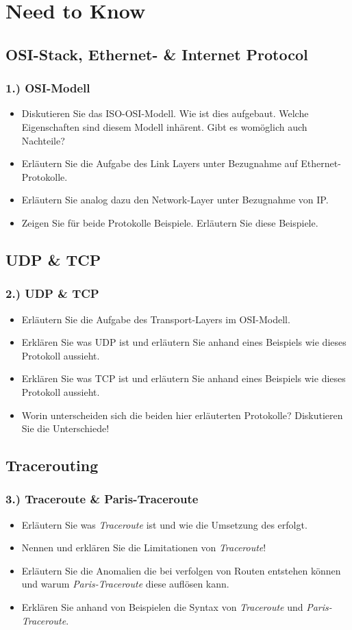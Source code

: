 \documentclass[xcolor=dvipsnames, aspectratio=169]{beamer}
\begin{document}
\section{Need to Know}
\subsection{OSI-Stack, Ethernet- \& Internet Protocol}
\begin{frame}
	\frametitle{1.) OSI-Modell}
	\begin{itemize}
		\item Diskutieren Sie das ISO-OSI-Modell. Wie ist dies aufgebaut. Welche Eigenschaften sind diesem Modell inhärent. Gibt es womöglich auch Nachteile?
		\item Erläutern Sie die Aufgabe des Link Layers unter Bezugnahme auf Ethernet-Protokolle. 
		\item Erläutern Sie analog dazu den Network-Layer unter Bezugnahme von IP.
		\item Zeigen Sie für beide Protokolle Beispiele. Erläutern Sie diese Beispiele.
	\end{itemize}
\end{frame}

\subsection{UDP \& TCP}
\begin{frame}
\frametitle{2.) UDP \& TCP}
	\begin{itemize}
		\item Erläutern Sie die Aufgabe des Transport-Layers im OSI-Modell.
		\item Erklären Sie was UDP ist und erläutern Sie anhand eines Beispiels wie dieses Protokoll aussieht.
		\item Erklären Sie was TCP ist und erläutern Sie anhand eines Beispiels wie dieses Protokoll aussieht.
		\item Worin unterscheiden sich die beiden hier erläuterten Protokolle? Diskutieren Sie die Unterschiede!
	\end{itemize}
\end{frame}

\subsection{Tracerouting}
\begin{frame}
\frametitle{3.) Traceroute \& Paris-Traceroute}
	\begin{itemize}
		\item Erläutern Sie was \emph{Traceroute} ist und wie die Umsetzung des erfolgt.
		\item Nennen und erklären Sie die Limitationen von \emph{Traceroute}!
		\item Erläutern Sie die Anomalien die bei verfolgen von Routen entstehen können und warum \emph{Paris-Traceroute} diese auflösen kann.
		\item Erklären Sie anhand von Beispielen die Syntax von \emph{Traceroute} und \emph{Paris-Traceroute}.
	\end{itemize}
\end{frame}
\end{document}
